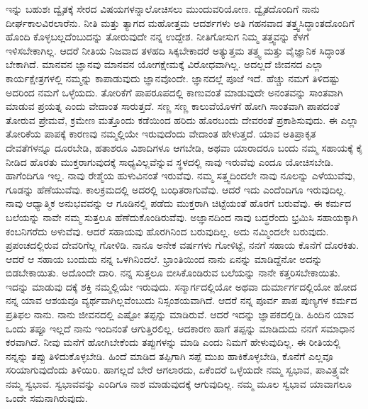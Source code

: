 ಇನ್ನು ಬಹುಶಃ ದ್ವೈತಕ್ಕೆ ಸೇರದ ವಿಷಯಗಳನ್ನಾಲೋಚಿಸಲು ಮುಂದುವರಿಯೋಣ. ದ್ವೈತದೊಂದಿಗೆ ನಾನು ದೀರ್ಘಕಾಲವಿರಲಾರೆನು. ನೀತಿ ಮತ್ತು ತ್ಯಾಗದ ಮಹೋತ್ತಮ ಆದರ್ಶಗಳು ಅತಿ ಗಹನವಾದ ತತ್ತ್ವಸಿದ್ಧಾಂತದೊಂದಿಗೆ ಹೊಂದಿ ಕೊಳ್ಳಬಲ್ಲದೆಂಬುದನ್ನು ತೋರುವುದೇ ನನ್ನ ಉದ್ದೇಶ. ನೀತಿಗೋಸುಗ ನಿಮ್ಮ ತತ್ತ್ವವನ್ನು ಕೆಳಗೆ ಇಳಿಸಬೇಕಾಗಿಲ್ಲ. ಆದರೆ ನೀತಿಯ ನಿಜವಾದ ತಳಹದಿ ಸಿಕ್ಕಬೇಕಾದರೆ ಅತ್ಯುತ್ತಮ ತತ್ತ್ವ ಮತ್ತು ವೈಜ್ಞಾನಿಕ ಸಿದ್ಧಾಂತ ಬೇಕಾಗಿದೆ. ಮಾನವನ ಜ್ಞಾನವು ಮಾನವನ ಯೋಗಕ್ಷೇಮಕ್ಕೆ ವಿರೋಧವಾಗಿಲ್ಲ. ಅದಲ್ಲದೆ ಜೀವನದ ಎಲ್ಲಾ ಕಾರ್ಯಕ್ಷೇತ್ರಗಳಲ್ಲಿ ನಮ್ಮನ್ನು ಕಾಪಾಡುವುದು ಜ್ಞಾನವೊಂದೇ. ಜ್ಞಾನದಲ್ಲೆ ಪೂಜೆ ಇದೆ. ಹೆಚ್ಚು ನಮಗೆ ತಿಳಿದಷ್ಟು ಅದರಿಂದ ನಮಗೆ ಒಳ್ಳೆಯದು. ತೋರಿಕೆಗೆ ಪಾಪರೂಪದಲ್ಲಿ ಕಾಣುವಂತೆ ಮಾಡುವುದೇ ಅನಂತವನ್ನು ಸಾಂತವಾಗಿ ಮಾಡುವ ಪ್ರಯತ್ನ ಎಂದು ವೇದಾಂತ ಸಾರುತ್ತದೆ. ಸಣ್ಣ ಸಣ್ಣ ಕಾಲುವೆಯೊಳಗೆ ಹೋಗಿ ಸಾಂತವಾಗಿ ಪಾಪದಂತೆ ತೋರುವ ಪ್ರೇಮವೆ, ಕ್ರಮೇಣ ಮತ್ತೊಂದು ಕಡೆಯಿಂದ ಹರಿದು ಹೊರಬಂದು ದೇವರಂತೆ ಪ್ರಕಾಶಿಸುವುದು. ಈ ಎಲ್ಲಾ ತೋರಿಕೆಯ ಪಾಪಕ್ಕೆ ಕಾರಣವು ನಮ್ಮಲ್ಲಿಯೇ ಇರುವುದೆಂದು ವೇದಾಂತ ಹೇಳುತ್ತದೆ. ಯಾವ ಅತಿಪ್ರಾಕೃತ ದೇವತೆಗಳನ್ನೂ ದೂರಬೇಡಿ, ಹತಾಶರೂ ವಿಶಾದಿಗಳೂ ಆಗಬೇಡಿ, ಅಥವಾ ಯಾರಾದರೂ ಬಂದು ನಮ್ಮ ಸಹಾಯಕ್ಕೆ ಕೈ ನೀಡಿದ ಹೊರತು ಮುಕ್ತರಾಗುವುದಕ್ಕೆ ಸಾಧ್ಯವಿಲ್ಲವೆನ್ನುವ ಸ್ಥಳದಲ್ಲಿ ನಾವು ಇರುವೆವು ಎಂದೂ ಯೋಚಿಸಬೇಡಿ. ಹಾಗೆಂದಿಗೂ ಇಲ್ಲ. ನಾವು ರೇಶ್ಮೆಯ ಹುಳುವಿನಂತೆ ಇರುವೆವು. ನಮ್ಮ ಸತ್ತ್ವದಿಂದಲೇ ನಾವು ನೂಲನ್ನು ಎಳೆಯುವೆವು, ಗೂಡನ್ನು ಹೆಣೆಯುವೆವು. ಕಾಲಕ್ರಮದಲ್ಲಿ ಅದರಲ್ಲಿ ಬಂಧಿತರಾಗುವೆವು. ಆದರೆ ಇದು ಎಂದೆಂದಿಗೂ ಇರುವುದಿಲ್ಲ. ನಾವು ಆಧ್ಯಾತ್ಮಿಕ ಅನುಭವವನ್ನು ಆ ಗೂಡಿನಲ್ಲಿ ಪಡೆದು ಮುಕ್ತರಾಗಿ ಚಿಟ್ಟೆಯಂತೆ ಹೊರಗೆ ಬರುವೆವು. ಈ ಕರ್ಮದ ಬಲೆಯನ್ನು ನಾವೇ ನಮ್ಮ ಸುತ್ತಲೂ ಹೆಣೆದುಕೊಂಡಿರುವೆವು. ಅಜ್ಞಾನದಿಂದ ನಾವು ಬದ್ಧರೆಂದು ಭ್ರಮಿಸಿ ಸಹಾಯಕ್ಕಾಗಿ ಕಂಬನಿಗರೆದು ಅಳುವೆವು. ಆದರೆ ಸಹಾಯವು ಹೊರಗಿನಿಂದ ಬರುವುದಿಲ್ಲ. ಅದು ನಮ್ಮಿಂದಲೇ ಬರುವುದು. ಪ್ರಪಂಚದಲ್ಲಿರುವ ದೇವರಿಗೆಲ್ಲ ಗೋಳಿಡಿ. ನಾನೂ ಅನೇಕ ವರ್ಷಗಳು ಗೋಳಿಟ್ಟೆ, ನನಗೆ ಸಹಾಯ ಕೊನೆಗೆ ದೊರಕಿತು. ಆದರೆ ಆ ಸಹಾಯ ಬಂದುದು ನನ್ನ ಒಳಗಿನಿಂದಲೆ. ಭ್ರಾಂತಿಯಿಂದ ನಾನು ಏನನ್ನು ಮಾಡಿದ್ದೆನೋ ಅದನ್ನು ಬಿಡಬೇಕಾಯಿತು. ಅದೊಂದೇ ದಾರಿ. ನನ್ನ ಸುತ್ತಲೂ ಬೀಸಿಕೊಂಡಿರುವ ಬಲೆಯನ್ನು ನಾನೇ ಕತ್ತರಿಸಬೇಕಾಯಿತು. ಇದನ್ನು ಮಾಡುವು ದಕ್ಕೆ ಶಕ್ತಿ ನಮ್ಮಲ್ಲಿಯೇ ಇರುವುದು. ಸನ್ಮಾರ್ಗದಲ್ಲಿಯೋ ಅಥವಾ ದುರ್ಮಾರ್ಗದಲ್ಲಿಯೋ ಹೋದ ನನ್ನ ಯಾವ ಆಶಯವೂ ವ್ಯರ್ಥವಾಗಿಲ್ಲವೆಂಬುದು ನಿಸ್ಸಂಶಯವಾಗಿದೆ. ಆದರೆ ನನ್ನ ಪೂರ್ವ ಪಾಪ ಪುಣ್ಯಗಳ ಕರ್ಮದ ಪ್ರತಿಫಲ ನಾನು. ನಾನು ಜೀವನದಲ್ಲಿ ಎಷ್ಟೋ ತಪ್ಪನ್ನು ಮಾಡಿರುವೆ. ಆದರೆ ಇದನ್ನು ಜ್ಞಾಪಕದಲ್ಲಿಡಿ. ಹಿಂದಿನ ಯಾವ ಒಂದು ತಪ್ಪೂ ಇಲ್ಲದೆ ನಾನು ಇಂದಿನಂತೆ ಆಗುತ್ತಿರಲಿಲ್ಲ. ಆದಕಾರಣ ಹಾಗೆ ತಪ್ಪನ್ನು ಮಾಡಿದುದು ನನಗೆ ಸಮಾಧಾನ ಕರವಾಗಿದೆ. ನೀವು ಮನೆಗೆ ಹೋಗಿಬೇಕೆಂದು ತಪ್ಪುಗಳನ್ನು ಮಾಡಿ ಎಂದು ನಿಮಗೆ ಹೇಳುವುದಿಲ್ಲ. ಈ ರೀತಿಯಲ್ಲಿ ನನ್ನನ್ನು ತಪ್ಪು ತಿಳಿದುಕೊಳ್ಳಬೇಡಿ. ಹಿಂದೆ ಮಾಡಿದ ತಪ್ಪಿಗಾಗಿ ಸಪ್ಪೆ ಮುಖ ಹಾಕಿಕೊಳ್ಳಬೇಡಿ, ಕೊನೆಗೆ ಎಲ್ಲವೂ ಸರಿಯಾಗುವುದೆಂದು ತಿಳಿಯಿರಿ. ಹಾಗಲ್ಲದೆ ಬೇರೆ ಆಗಲಾರದು, ಏಕೆಂದರೆ ಒಳ್ಳೆಯದೇ ನಮ್ಮ ಸ್ವಭಾವ, ಪಾವಿತ್ರ್ಯವೇ ನಮ್ಮ ಸ್ವಭಾವ. ಸ್ವಭಾವವನ್ನು ಎಂದಿಗೂ ನಾಶ ಮಾಡುವುದಕ್ಕೆ ಆಗುವುದಿಲ್ಲ. ನಮ್ಮ ಮೂಲ ಸ್ವಭಾವ ಯಾವಾಗಲೂ ಒಂದೇ ಸಮನಾಗಿರುವುದು. 

\vskip 0.2cm

